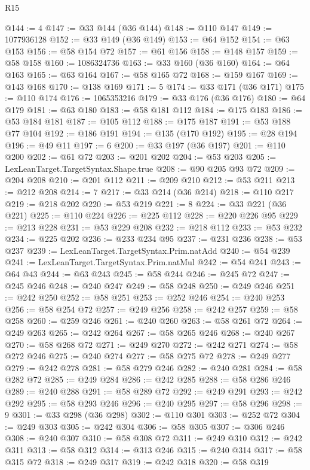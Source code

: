 \begin{lexlean}{R15}
\begin{coremodule}
@144 := 4
@147 := @33 @144 (@36 @144)
@148 := @110 @147
@149 := 1077936128
@152 := @33 @149 (@36 @149)
@153 := @64 @152
@154 := @63 @153
@156 := @58 @154 @72
@157 := @61 @156
@158 := @148 @157
@159 := @58 @158
@160 := 1086324736
@163 := @33 @160 (@36 @160)
@164 := @64 @163
@165 := @63 @164
@167 := @58 @165 @72
@168 := @159 @167
@169 := @143 @168
@170 := @138 @169
@171 := 5
@174 := @33 @171 (@36 @171)
@175 := @110 @174
@176 := 1065353216
@179 := @33 @176 (@36 @176)
@180 := @64 @179
@181 := @63 @180
@183 := @58 @181 @112
@184 := @175 @183
@186 := @53 @184 @181
@187 := @105 @112
@188 := @175 @187
@191 := @53 @188 @77 @104
@192 := @186 @191
@194 := @135 (@170 @192)
@195 := @28 @194
@196 := @49 @11
@197 := 6
@200 := @33 @197 (@36 @197)
@201 := @110 @200
@202 := @61 @72
@203 := @201 @202
@204 := @53 @203
@205 := LexLeanTarget.TargetSyntax.Shape.true
@208 := @90 @205 @93 @72
@209 := @204 @208
@210 := @201 @112
@211 := @209 @210
@212 := @53 @211
@213 := @212 @208
@214 := 7
@217 := @33 @214 (@36 @214)
@218 := @110 @217
@219 := @218 @202
@220 := @53 @219
@221 := 8
@224 := @33 @221 (@36 @221)
@225 := @110 @224
@226 := @225 @112
@228 := @220 @226 @95
@229 := @213 @228
@231 := @53 @229 @208
@232 := @218 @112
@233 := @53 @232
@234 := @225 @202
@236 := @233 @234 @95
@237 := @231 @236
@238 := @53 @237
@239 := LexLeanTarget.TargetSyntax.Prim.natAdd
@240 := @54 @239
@241 := LexLeanTarget.TargetSyntax.Prim.natMul
@242 := @54 @241
@243 := @64 @43
@244 := @63 @243
@245 := @58 @244
@246 := @245 @72
@247 := @245 @246
@248 := @240 @247
@249 := @58 @248
@250 := @249 @246
@251 := @242 @250
@252 := @58 @251
@253 := @252 @246
@254 := @240 @253
@256 := @58 @254 @72
@257 := @249 @256
@258 := @242 @257
@259 := @58 @258
@260 := @259 @246
@261 := @240 @260
@263 := @58 @261 @72
@264 := @249 @263
@265 := @242 @264
@267 := @58 @265 @246
@268 := @240 @267
@270 := @58 @268 @72
@271 := @249 @270
@272 := @242 @271
@274 := @58 @272 @246
@275 := @240 @274
@277 := @58 @275 @72
@278 := @249 @277
@279 := @242 @278
@281 := @58 @279 @246
@282 := @240 @281
@284 := @58 @282 @72
@285 := @249 @284
@286 := @242 @285
@288 := @58 @286 @246
@289 := @240 @288
@291 := @58 @289 @72
@292 := @249 @291
@293 := @242 @292
@295 := @58 @293 @246
@296 := @240 @295
@297 := @58 @296
@298 := 9
@301 := @33 @298 (@36 @298)
@302 := @110 @301
@303 := @252 @72
@304 := @249 @303
@305 := @242 @304
@306 := @58 @305
@307 := @306 @246
@308 := @240 @307
@310 := @58 @308 @72
@311 := @249 @310
@312 := @242 @311
@313 := @58 @312
@314 := @313 @246
@315 := @240 @314
@317 := @58 @315 @72
@318 := @249 @317
@319 := @242 @318
@320 := @58 @319

\end{coremodule}
\end{lexlean}
